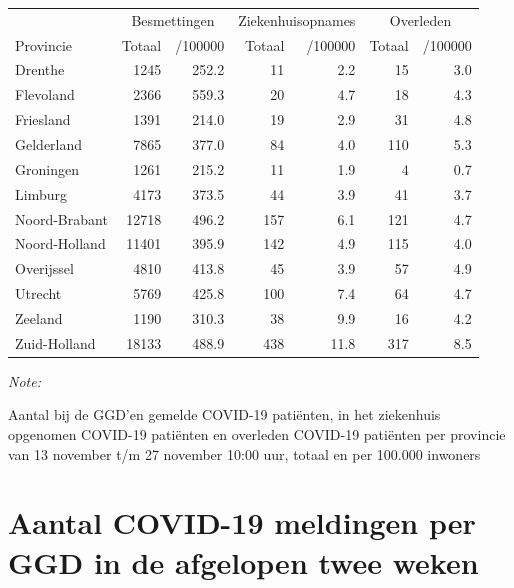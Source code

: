 \documentclass[
  english,
  man,floatsintext]{apa6}
\begin{document}
\begin{table}[H]
\centering
\begin{threeparttable}
\begin{tabular}{lrrrrrr}
\toprule
\multicolumn{1}{c}{ } & \multicolumn{2}{c}{Besmettingen} & \multicolumn{2}{c}{Ziekenhuisopnames} & \multicolumn{2}{c}{Overleden} \\
\cmidrule(l{3pt}r{3pt}){2-3} \cmidrule(l{3pt}r{3pt}){4-5} \cmidrule(l{3pt}r{3pt}){6-7}
Provincie & Totaal & /100000 & Totaal & /100000 & Totaal & /100000\\
\midrule
Drenthe & 1245 & 252.2 & 11 & 2.2 & 15 & 3.0\\
Flevoland & 2366 & 559.3 & 20 & 4.7 & 18 & 4.3\\
Friesland & 1391 & 214.0 & 19 & 2.9 & 31 & 4.8\\
Gelderland & 7865 & 377.0 & 84 & 4.0 & 110 & 5.3\\
Groningen & 1261 & 215.2 & 11 & 1.9 & 4 & 0.7\\
Limburg & 4173 & 373.5 & 44 & 3.9 & 41 & 3.7\\
Noord-Brabant & 12718 & 496.2 & 157 & 6.1 & 121 & 4.7\\
Noord-Holland & 11401 & 395.9 & 142 & 4.9 & 115 & 4.0\\
Overijssel & 4810 & 413.8 & 45 & 3.9 & 57 & 4.9\\
Utrecht & 5769 & 425.8 & 100 & 7.4 & 64 & 4.7\\
Zeeland & 1190 & 310.3 & 38 & 9.9 & 16 & 4.2\\
Zuid-Holland & 18133 & 488.9 & 438 & 11.8 & 317 & 8.5\\
\bottomrule
\end{tabular}
\begin{tablenotes}
\item \textit{Note: } 
\item Aantal bij de GGD’en gemelde COVID-19 patiënten, in het ziekenhuis opgenomen COVID-19 patiënten en overleden COVID-19 patiënten per provincie van 13 november t/m 27 november 10:00 uur, totaal en per 100.000 inwoners
\end{tablenotes}
\end{threeparttable}
\end{table}

\newpage

\hypertarget{aantal-covid-19-meldingen-per-ggd-in-de-afgelopen-twee-weken}{%
\section{Aantal COVID-19 meldingen per GGD in de afgelopen twee weken}\label{aantal-covid-19-meldingen-per-ggd-in-de-afgelopen-twee-weken}}
\end{document}
